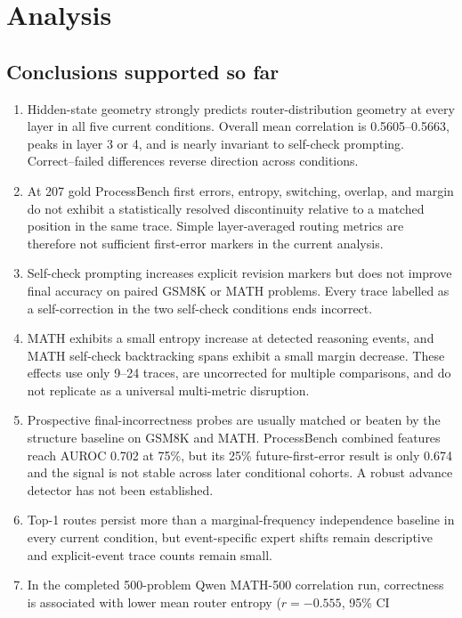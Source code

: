 \documentclass[manuscript,screen,review]{jair}
\begin{document}
\section{Analysis}

\subsection{Conclusions supported so far}

\begin{enumerate}
\item Hidden-state geometry strongly predicts router-distribution geometry at
every layer in all five current conditions.  Overall mean correlation is
0.5605--0.5663, peaks in layer 3 or 4, and is nearly invariant to self-check
prompting.  Correct--failed differences reverse direction across conditions.
\item At 207 gold ProcessBench first errors, entropy, switching, overlap, and
margin do not exhibit a statistically resolved discontinuity relative to a
matched position in the same trace.  Simple layer-averaged routing metrics are
therefore not sufficient first-error markers in the current analysis.
\item Self-check prompting increases explicit revision markers but does not
improve final accuracy on paired GSM8K or MATH problems.  Every trace labelled
as a self-correction in the two self-check conditions ends incorrect.
\item MATH exhibits a small entropy increase at detected reasoning events,
and MATH self-check backtracking spans exhibit a small margin decrease.  These
effects use only 9--24 traces, are uncorrected for multiple comparisons, and
do not replicate as a universal multi-metric disruption.
\item Prospective final-incorrectness probes are usually matched or beaten by
the structure baseline on GSM8K and MATH.  ProcessBench combined features
reach AUROC 0.702 at 75\%, but its 25\% future-first-error result is only 0.674
and the signal is not stable across later conditional cohorts.  A robust
advance detector has not been established.
\item Top-1 routes persist more than a marginal-frequency independence
baseline in every current condition, but event-specific expert shifts remain
descriptive and explicit-event trace counts remain small.
\item In the completed 500-problem Qwen MATH-500 correlation run, correctness
is associated with lower mean router entropy ($r=-0.555$, 95\% CI

\end{enumerate}
\end{document}
